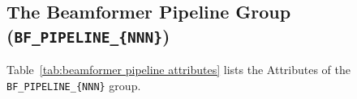 \documentclass[a4paper,10pt,bibtotoc]{scrartcl}
\begin{document}
\clearpage
\subsection{The Beamformer Pipeline Group ({\tt BF\_PIPELINE\_\{NNN\}})}
\label{sec:beamformer pipeline group}

Table~\ref{tab:beamformer pipeline attributes} lists the Attributes of the \verb|BF_PIPELINE_{NNN}| group.

\vspace{5mm}
\tablefirsthead{%
}
\tablelasttail{\hline}
\end{document}
